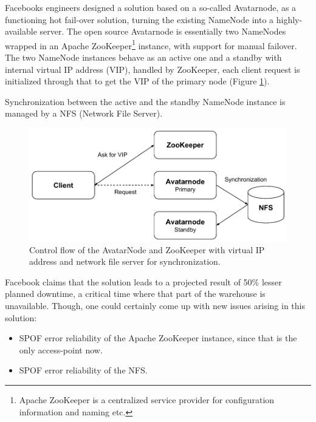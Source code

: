 \newpage
Facebooks engineers designed a solution based on a so-called Avatar\-node, as a functioning hot fail-over solution, turning the existing NameNode into a highly-available server. The open source Avatarnode is essentially two NameNodes wrapped in an Apache ZooKeeper\footnote{Apache ZooKeeper\cite{PageZookeper} is a centralized service provider for configuration information and naming etc.} instance, with support for manual failover. The two NameNode instances behave as an active one and a standby with internal virtual IP address (VIP), handled by ZooKeeper, \ie each client request is initialized through that to get the VIP of the primary node (Figure \ref{fig:facebook-avatarnode}).
\newline

Synchronization between the active and the standby NameNode instance is managed by a NFS (Network File Server).
\vspace*{3mm}

\begin{figure}[h!]
	\centering
	\includegraphics[scale=0.8]{pdf/facebook-avatarnode.pdf}
	\caption[Avatarnode: Facebooks Hadoop implementation]{Control flow of the AvatarNode and ZooKeeper with virtual IP address and network file server for synchronization. \label{fig:facebook-avatarnode}}
	\vspace*{3mm}
\end{figure}

Facebook claims that the solution leads to a projected result of 50\% lesser planned downtime, \ie a critical time where that part of the warehouse is unavailable. Though, one could certainly come up with new issues arising in this solution:
\begin{itemize}
	\item SPOF error reliability of the Apache ZooKeeper instance, since that is the only access-point now.
	\item SPOF error reliability of the NFS.
\end{itemize}

